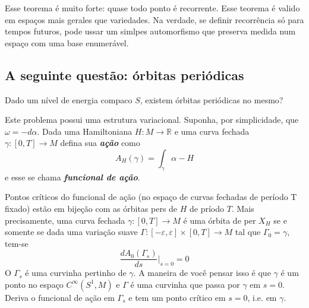 Esse teorema é muito forte: {\color{2}quase todo ponto é recorrente}. Esse teorema é valido em espaços mais gerales que variedades. Na verdade, se definir recorrência só para tempos futuros, pode ussar um simlpes automorfismo que preserva medida num espaço com uma base enumerável.

\subsection{A seguinte questão: órbitas periódicas}

\begin{question}\leavevmode
Dado um nível de energia compaco $S$, existem órbitas periódicas no mesmo?
\end{question}

Este problema possui uma estrutura variacional. Suponha, por simplicidade, que $\omega=-d\alpha$. Dada uma Hamiltoniana $H:M\to\mathbb{R}$ e uma curva fechada $\gamma:[0,T]\to M$ defina sua \textit{\textbf{ação}} como
\[A_H(\gamma)=\int_{\gamma}\alpha-H\]
e esse se chama \textit{\textbf{funcional de ação}}.

\begin{prop}\leavevmode
	Pontos críticos do funcional de ação (no espaço de curvas fechadas de período T fixado) estão em bijeção com as órbitas pers de $H$ de príodo $T$. Mais precisamente, uma curva fechada $\gamma:[0,T]\to M$ é uma órbita de per $X_H$ se e somente se dada uma variação suave $\Gamma:[-\varepsilon,\varepsilon]\times [0,T]\to M$ tal que $\Gamma_0=\gamma$, tem-se
	\[\frac{d A_0(\Gamma_s)}{ds}\Big|_{s=0}=0\]
{\color{5}O $\Gamma_s$ é uma curvinha pertinho de $\gamma$. A maneira de você pensar isso é que $\gamma$ é um ponto no espaço $C^\infty(S^1,M)$ e $\Gamma$ é uma curvinha que passa por $\gamma$ em $s=0$. Deriva o funcional de ação em $\Gamma_s$ e tem um ponto crítico em $s=0$, i.e. em  $\gamma$.}
\end{prop}

